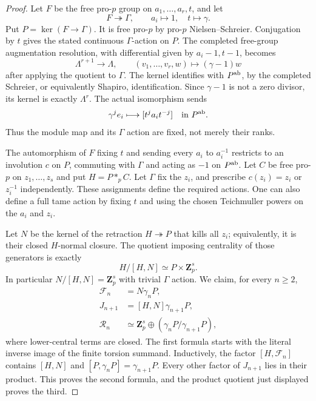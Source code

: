 \begin{proof}
Let $F$ be the free pro-$p$ group on
$a_1,\ldots,a_r,t$, and let
\[
 F\twoheadrightarrow\Gamma,\qquad a_i\longmapsto1,
                         \quad t\longmapsto\gamma.
\]
Put $P=\ker(F\to\Gamma)$. It is free pro-$p$ by
pro-$p$ Nielsen--Schreier. Conjugation by $t$ gives
the stated continuous $\Gamma$-action on $P$.
The completed free-group augmentation resolution,
with differential given by $a_i-1,t-1$, becomes
\[
 \Lambda^{r+1}\longrightarrow\Lambda,\qquad
 (v_1,\ldots,v_r,w)\longmapsto(\gamma-1)w
\]
after applying the quotient to $\Gamma$.
The kernel identifies with $P^{\rm ab}$, by the completed
Schreier, or equivalently Shapiro, identification.
Since $\gamma-1$ is not a zero divisor, its kernel
is exactly $\Lambda^r$. The actual isomorphism sends
\[
       \gamma^j e_i\longmapsto[t^j a_i t^{-j}]
                                  \quad\text{in }P^{\rm ab}.
\]
Thus the module map and its $\Gamma$ action are fixed,
not merely their ranks.

The automorphism of $F$ fixing $t$ and sending every
$a_i$ to $a_i^{-1}$ restricts to an involution $c$
on $P$, commuting with $\Gamma$ and acting as $-1$
on $P^{\rm ab}$. Let $C$ be free pro-$p$ on
$z_1,\ldots,z_s$ and put $H=P\mathbin{*}_{p}C$.
Let $\Gamma$ fix the $z_i$, and prescribe
$c(z_i)=z_i$ or $z_i^{-1}$ independently.
These assignments define the required actions.
One can also define a full tame action by fixing $t$
and using the chosen Teichmuller powers on the $a_i$
and $z_i$.

Let $N$ be the kernel of the retraction
$H\twoheadrightarrow P$ that kills all $z_i$;
equivalently, it is their closed $H$-normal closure.
The quotient imposing centrality of those generators
is exactly
\[
                     H/[H,N]\simeq P\times\mathbf Z_p^s.
\]
In particular $N/[H,N]=\mathbf Z_p^s$ with trivial
$\Gamma$ action. We claim, for every $n\geq2$,
\begin{align*}
 \mathcal F_n&=N\gamma_nP,\\
 J_{n+1}&=[H,N]\gamma_{n+1}P,\\
 \mathcal R_n&\simeq\mathbf Z_p^s\oplus
                              (\gamma_nP/\gamma_{n+1}P),
\end{align*}
where lower-central terms are closed. The first
formula starts with the literal inverse image of
the finite torsion summand. Inductively, the factor
$[H,\mathcal F_n]$ contains $[H,N]$ and
$[P,\gamma_nP]=\gamma_{n+1}P$. Every other factor
of $J_{n+1}$ lies in their product. This proves the
second formula, and the product quotient just
displayed proves the third.


\end{proof}
